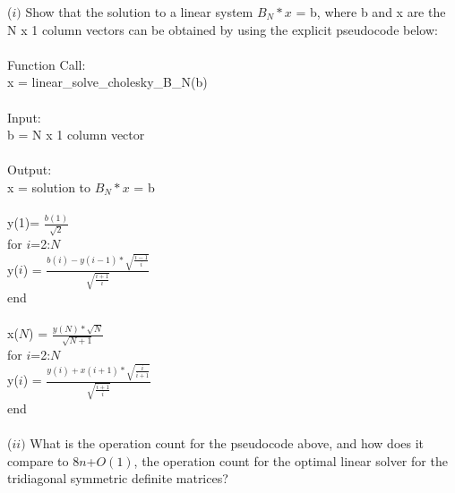 \documentclass{article}
\begin{document}
(\(i)\) Show that the solution to a linear system \(B_N*x\) = b, where b and x are the N x 1 column vectors can be obtained by using the explicit pseudocode below:\\\\
	\indent \hspace{5 cm} Function Call:\\
	\indent \hspace{5 cm} x = linear\_solve\_cholesky\_B\_N(b)\\\\
	\indent \hspace{5 cm} Input:\\
	\indent \hspace{5 cm} b = N x 1 column vector \\\\
	\indent \hspace{5 cm} Output:\\
	\indent \hspace{5 cm} x = solution to \(B_N*x\) = b\\\\
	\indent \hspace{5 cm} y(1)= \(\frac{b(1)}{\sqrt{2}}\) \\
	\indent \hspace{5 cm} for \(i\)=2:\(N\) \\
	\indent \hspace{5 cm} \indent y(\(i\)) = \(\frac{b(i)-y(i-1)*\sqrt{\frac{i-1}{i}}}{\sqrt{\frac{i+1}{i}}}\) \\
	\indent \hspace{5 cm} end \\\\
	\indent \hspace{5 cm} x(\(N\)) = \(\frac{y(N) * \sqrt{N}}{\sqrt{N+1}}\)\\
	\indent \hspace{5 cm} for \(i\)=2:\(N\) \\
	\indent \hspace{5 cm} \indent y(\(i\)) = \(\frac{y(i)+x(i+1)*\sqrt{\frac{i}{i+1}}}{\sqrt{\frac{i+1}{i}}}\) \\
	\indent \hspace{5 cm} end \\\\
	
(\(ii)\) What is the operation count for the pseudocode above, and how does it compare to \(8n\)+\(O(1)\), the operation count for the optimal linear solver for the tridiagonal symmetric definite matrices? \\\\
\end{document}
